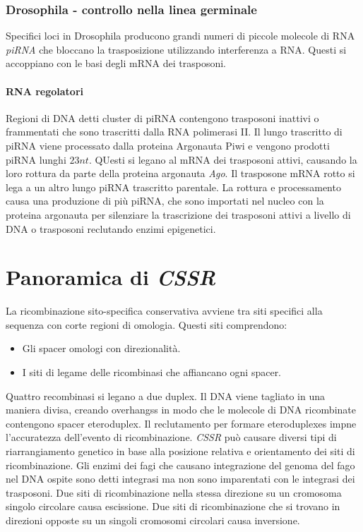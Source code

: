 		\subsubsection{Drosophila - controllo nella linea germinale}
		Specifici loci in Drosophila producono grandi numeri di piccole molecole di RNA \emph{piRNA} che bloccano la trasposizione utilizzando interferenza a RNA.
		Questi si accoppiano con le basi degli mRNA dei trasposoni.

			\paragraph{RNA regolatori}
			Regioni di DNA detti cluster di piRNA contengono trasposoni inattivi o frammentati che sono trascritti dalla RNA polimerasi II.
			Il lungo trascritto di piRNA viene processato dalla proteina Argonauta Piwi e vengono prodotti piRNA lunghi $23nt$.
			QUesti si legano al mRNA dei trasposoni attivi, causando la loro rottura da parte della proteina argonauta \emph{Ago}.
			Il trasposone mRNA rotto si lega a un altro lungo piRNA trascritto parentale.
			La rottura e processamento causa una produzione di pi\`u piRNA, che sono importati nel nucleo con la proteina argonauta per silenziare la trascrizione dei trasposoni attivi a livello di DNA o trasposoni reclutando enzimi epigenetici.

\section{Panoramica di \emph{CSSR}}
La ricombinazione sito-specifica conservativa avviene tra siti specifici alla sequenza con corte regioni di omologia.
Questi siti comprendono:
\begin{itemize}
	\item Gli spacer omologi con direzionalit\`a.
	\item I siti di legame delle ricombinasi che affiancano ogni spacer.
\end{itemize}
Quattro recombinasi si legano a due duplex.
Il DNA viene tagliato in una maniera divisa, creando overhangss in modo che le molecole di DNA ricombinate contengono spacer eteroduplex.
Il reclutamento per formare eteroduplexes impne l'accuratezza dell'evento di ricombinazione.
\emph{CSSR} pu\`o causare diversi tipi di riarrangiamento genetico in base alla posizione relativa e orientamento dei siti di ricombinazione.
Gli enzimi dei fagi che causano integrazione del genoma del fago nel DNA ospite sono detti integrasi ma non sono imparentati con le integrasi dei trasposoni.
Due siti di ricombinazione nella stessa direzione su un cromosoma singolo circolare causa escissione.
Due siti di ricombinazione che si trovano in direzioni opposte su un singoli cromosomi circolari causa inversione.
	

